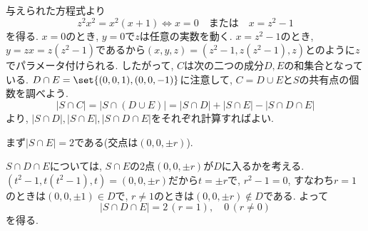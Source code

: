 与えられた方程式より
\[
z^2x^2 = x^2(x+1) \iff x=0 \quad \text{または} \quad x = z^2 - 1
\]
を得る. $x=0$のとき, $y=0$で$z$は任意の実数を動く. $x=z^2 - 1$のとき, $y=zx = z(z^2 - 1)$であるから$(x,y,z) = (z^2-1, z(z^2-1), z)$とのように$z$でパラメータ付けられる. したがって, $C$は次の二つの成分$D,E$の和集合となっている.
$D\cap E = \set{(0,0,1), (0,0,-1)}$に注意して, $C = D\cup E$と$S$の共有点の個数を調べよう.
\[
|S\cap C| = |S\cap (D\cup E)| = |S\cap D| + |S\cap E| - |S\cap D\cap E|
\]
より, $|S\cap D|, |S\cap E|, |S\cap D\cap  E|$をそれぞれ計算すればよい.
\par
まず$|S\cap E| = 2$である(交点は$(0,0,\pm r)$).


$S\cap D\cap E$については, $S\cap E$の2点$(0,0,\pm r)$が$D$に入るかを考える. $(t^2-1,t(t^2-1), t) = (0,0,\pm r)$だから$t=\pm r$で, $r^2 - 1 = 0$, すなわち$r=1$のときは$(0,0,\pm 1)\in D$で, $r\neq 1$のときは$(0,0,\pm r)\notin D$である. よって
\[|S\cap D\cap E| = 2\, (r=1),\quad 0\, (r\neq 0)\]
を得る.

